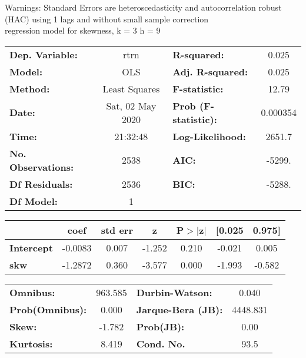 Warnings: \newline
 [1] Standard Errors are heteroscedasticity and autocorrelation robust (HAC) using 1 lags and without small sample correction\\ 

regression model for skewness, k = 3 h = 9\begin{center}
\begin{tabular}{lclc}
\toprule
\textbf{Dep. Variable:}    &       rtrn       & \textbf{  R-squared:         } &     0.025   \\
\textbf{Model:}            &       OLS        & \textbf{  Adj. R-squared:    } &     0.025   \\
\textbf{Method:}           &  Least Squares   & \textbf{  F-statistic:       } &     12.79   \\
\textbf{Date:}             & Sat, 02 May 2020 & \textbf{  Prob (F-statistic):} &  0.000354   \\
\textbf{Time:}             &     21:32:48     & \textbf{  Log-Likelihood:    } &    2651.7   \\
\textbf{No. Observations:} &        2538      & \textbf{  AIC:               } &    -5299.   \\
\textbf{Df Residuals:}     &        2536      & \textbf{  BIC:               } &    -5288.   \\
\textbf{Df Model:}         &           1      & \textbf{                     } &             \\
\bottomrule
\end{tabular}
\begin{tabular}{lcccccc}
                   & \textbf{coef} & \textbf{std err} & \textbf{z} & \textbf{P$> |$z$|$} & \textbf{[0.025} & \textbf{0.975]}  \\
\midrule
\textbf{Intercept} &      -0.0083  &        0.007     &    -1.252  &         0.210        &       -0.021    &        0.005     \\
\textbf{skw}       &      -1.2872  &        0.360     &    -3.577  &         0.000        &       -1.993    &       -0.582     \\
\bottomrule
\end{tabular}
\begin{tabular}{lclc}
\textbf{Omnibus:}       & 963.585 & \textbf{  Durbin-Watson:     } &    0.040  \\
\textbf{Prob(Omnibus):} &   0.000 & \textbf{  Jarque-Bera (JB):  } & 4448.831  \\
\textbf{Skew:}          &  -1.782 & \textbf{  Prob(JB):          } &     0.00  \\
\textbf{Kurtosis:}      &   8.419 & \textbf{  Cond. No.          } &     93.5  \\
\bottomrule
\end{tabular}
\end{center}

